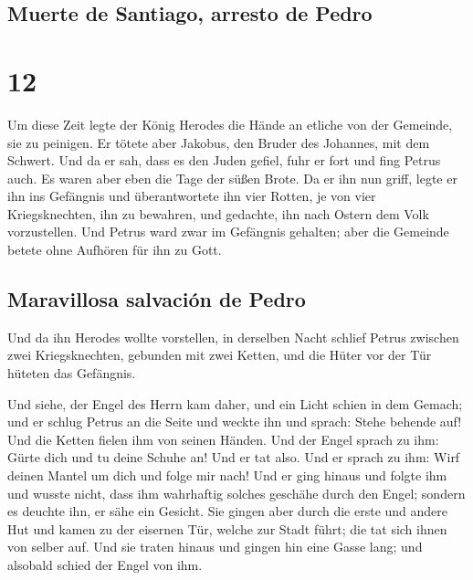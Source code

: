 \hypertarget{muerte-de-santiago-arresto-de-pedro}{%
\subsection{Muerte de Santiago, arresto de
Pedro}\label{muerte-de-santiago-arresto-de-pedro}}

\hypertarget{section-11}{%
\section{12}\label{section-11}}

 Um diese Zeit legte der König Herodes die Hände an
etliche von der Gemeinde, sie zu peinigen.  Er tötete aber
Jakobus, den Bruder des Johannes, mit dem Schwert.  Und da
er sah, dass es den Juden gefiel, fuhr er fort und fing Petrus auch. Es
waren aber eben die Tage der süßen Brote.  Da er ihn nun
griff, legte er ihn ins Gefängnis und überantwortete ihn vier Rotten, je
von vier Kriegsknechten, ihn zu bewahren, und gedachte, ihn nach Ostern
dem Volk vorzustellen.  Und Petrus ward zwar im Gefängnis
gehalten; aber die Gemeinde betete ohne Aufhören für ihn zu Gott.

\hypertarget{maravillosa-salvaciuxf3n-de-pedro}{%
\subsection{Maravillosa salvación de
Pedro}\label{maravillosa-salvaciuxf3n-de-pedro}}

 Und da ihn Herodes wollte vorstellen, in derselben Nacht
schlief Petrus zwischen zwei Kriegsknechten, gebunden mit zwei Ketten,
und die Hüter vor der Tür hüteten das Gefängnis.

 Und siehe, der Engel des Herrn kam daher, und ein Licht
schien in dem Gemach; und er schlug Petrus an die Seite und weckte ihn
und sprach: Stehe behende auf! Und die Ketten fielen ihm von seinen
Händen.  Und der Engel sprach zu ihm: Gürte dich und tu
deine Schuhe an! Und er tat also. Und er sprach zu ihm: Wirf deinen
Mantel um dich und folge mir nach!  Und er ging hinaus und
folgte ihm und wusste nicht, dass ihm wahrhaftig solches geschähe durch
den Engel; sondern es deuchte ihn, er sähe ein Gesicht. 
Sie gingen aber durch die erste und andere Hut und kamen zu der eisernen
Tür, welche zur Stadt führt; die tat sich ihnen von selber auf. Und sie
traten hinaus und gingen hin eine Gasse lang; und alsobald schied der
Engel von ihm.

